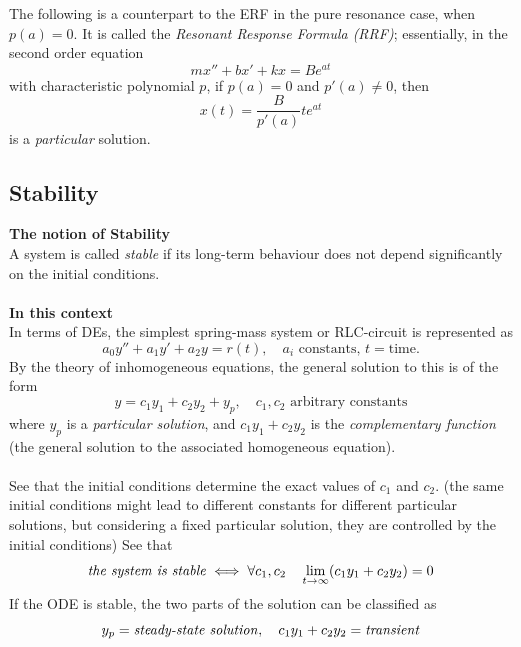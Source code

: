\documentclass{report}
\begin{document}
The following is a counterpart to the ERF in the pure resonance case, when $p(a)=0$. It is called the 
\textit{Resonant Response Formula (RRF)}; essentially, in the second order equation
\begin{equation*}
mx''+bx'+kx=Be^{at}
\end{equation*}
with characteristic polynomial $p$, if $p(a)=0$ and $p'(a)\neq0$, then 
\begin{equation*}
x(t)=\frac{B}{p'(a)}te^{at}
\end{equation*}
is a \textit{particular} solution.
\newpage

\subsection{Stability}
\textbf{The notion of Stability}\\
A system is called \textit{stable} if its long-term behaviour does not depend significantly 
on the initial conditions.\\
\vspace{1mm}\\
\textbf{In this context}\\
In terms of DEs, the simplest spring-mass system or RLC-circuit is represented as
\begin{equation*}
a_0y''+a_1y'+a_2y=r(t),\quad a_i\text{ constants, }t=\text{time.}
\end{equation*}
By the theory of inhomogeneous equations, the general solution to this is of the form
\begin{equation*}
y=c_1y_1+c_2y_2+y_p,\quad\text{$c_1,c_2$ arbitrary constants}
\end{equation*}
where $y_p$ is a \textit{particular solution}, and $c_1y_1+c_2y_2$ is the \textit{complementary function} (the
general solution to the associated homogeneous equation).\\
\vspace{1mm}\\
See that the initial conditions determine the exact values of $c_1$ and $c_2$. (the same initial conditions
might lead to different constants for different particular solutions, but considering a
fixed particular solution, they are controlled by the initial conditions) See that
\begin{equation*}
\text{\textit{the system is stable}}\iff\forall c_1,c_2\quad\lim_{t\to\infty}(c_1y_1+c_2y_2)=0
\end{equation*}
If the ODE is stable, the two parts of the solution can be classified as
\begin{equation*}
y_p=\text{\textit{steady-state solution}},\quad c_1y_1+c_2y_2=\text{\textit{transient}}
\end{equation*}
\end{document}
